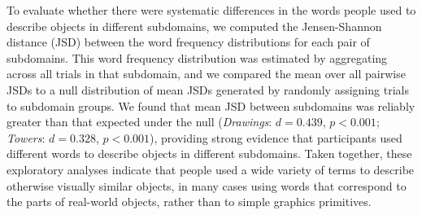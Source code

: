 \documentclass[10pt,letterpaper]{article}
\begin{document}
To evaluate whether there were systematic differences in the words people used to describe objects in different subdomains, we computed the Jensen-Shannon distance (JSD) between the word frequency distributions for each pair of subdomains.
This word frequency distribution was estimated by aggregating across all trials in that subdomain, and we compared the mean over all pairwise JSDs to a null distribution of mean JSDs generated by randomly assigning trials to subdomain groups.
We found that mean JSD between subdomains was reliably greater than that expected under the null (\textit{Drawings}: $d = 0.439$, $p < 0.001$; \textit{Towers}: $d = 0.328$, $p < 0.001$), providing strong evidence that participants used different words to describe objects in different subdomains.
Taken together, these exploratory analyses indicate that people used a wide variety of terms to describe otherwise visually similar objects, in many cases using words that correspond to the parts of real-world objects, rather than to simple graphics primitives.



\end{document}
